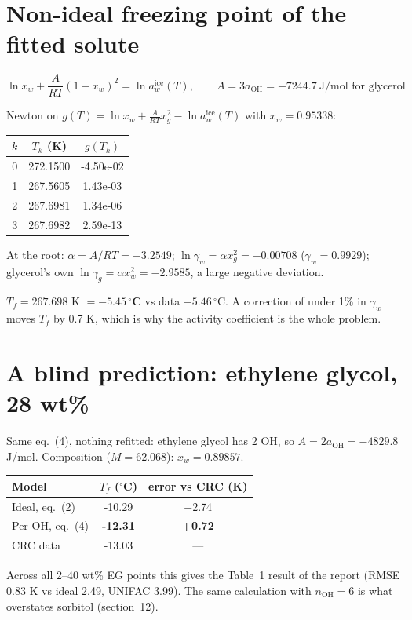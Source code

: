 \documentclass[11pt,a4paper]{article}
\newcommand{\aoh}{a_{\mathrm{OH}}}
\newcommand{\aice}{\ln a_w^{\mathrm{ice}}}
\begin{document}
\section{Non-ideal freezing point of the fitted solute}
\begin{eqbox}
\[ \ln x_w+\frac{A}{RT}(1-x_w)^2=\aice(T),\qquad A=3\aoh=-7244.7\ \text{J/mol for glycerol}\tag{4}\]
\end{eqbox}
Newton on $g(T)=\ln x_w+\frac{A}{RT}x_g^2-\aice(T)$ with $x_w=0.95338$:
\begin{center}\small
\begin{tabular}{c c c}
\toprule
$k$ & $T_k$ (K) & $g(T_k)$\\
\midrule
0 & 272.1500 & -4.50e-02\\
1 & 267.5605 & 1.43e-03\\
2 & 267.6981 & 1.34e-06\\
3 & 267.6982 & 2.59e-13\\
\bottomrule
\end{tabular}
\end{center}
At the root: $\alpha=A/RT=-3.2549$; $\ln\gamma_w=\alpha x_g^2=-0.00708$ ($\gamma_w=0.9929$);
glycerol's own $\ln\gamma_g=\alpha x_w^2=-2.9585$, a large negative deviation.
\begin{result}
$T_f=267.698$ K $=\mathbf{-5.45\,^\circ}$\textbf{C} vs data $-5.46\,^\circ$C. A correction of under 1\% in $\gamma_w$
moves $T_f$ by 0.7 K, which is why the activity coefficient is the whole problem.
\end{result}

\section{A blind prediction: ethylene glycol, 28 wt\%}
Same eq.~(4), nothing refitted: ethylene glycol has 2 OH, so $A=2\aoh=-4829.8$ J/mol. Composition ($M=62.068$):
$x_w=0.89857$.
\begin{center}\small
\begin{tabular}{l c c}
\toprule
Model & $T_f$ ($^\circ$C) & error vs CRC (K)\\
\midrule
Ideal, eq.~(2) & -10.29 & +2.74\\
Per-OH, eq.~(4) & \textbf{-12.31} & \textbf{+0.72}\\
CRC data & -13.03 & ---\\
\bottomrule
\end{tabular}
\end{center}
Across all 2--40 wt\% EG points this gives the Table~1 result of the report (RMSE 0.83 K vs ideal 2.49, UNIFAC 3.99).
The same calculation with $n_\mathrm{OH}=6$ is what overstates sorbitol (section~12).
\end{document}
